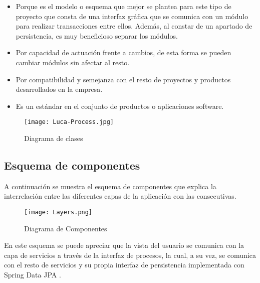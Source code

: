 		\begin{itemize}
			\item Porque es el modelo o esquema que mejor se plantea para este tipo de proyecto que consta de una interfaz gráfica que se comunica con un módulo para realizar transacciones entre ellos. Además, al constar de un apartado de persistencia, es muy beneficioso separar los módulos.
			\item Por capacidad de actuación frente a cambios, de esta forma se pueden cambiar módulos sin afectar al resto.
			\item Por compatibilidad y semejanza con el resto de proyectos y productos desarrollados en la empresa.
			\item Es un estándar en el conjunto de productos o aplicaciones software.
		\end{itemize} 
		
		\begin{figure}[H]
			\centering
			\texttt{[image: Luca-Process.jpg]}
			\caption{Diagrama de clases}\label{fig:Luca-Process}
		\end{figure}
	
	
	\subsection{Esquema de componentes}
	
	A continuación se muestra el esquema de componentes que explica la interrelación entre las diferentes capas de la aplicación con las consecutivas.
	
	\begin{figure}[H]
		\centering
		\texttt{[image: Layers.png]}
		\caption{Diagrama de Componentes}\label{fig:Layers}
	\end{figure}

	
	En este esquema se puede apreciar que la vista del usuario se comunica con la capa de servicios a través de la interfaz de procesos, la cual, a su vez, se comunica con el resto de servicios y su propia interfaz de persistencia implementada con Spring Data JPA \cite{jpa}.
	